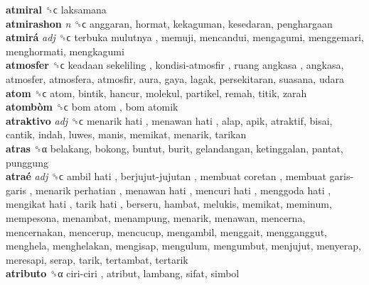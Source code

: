 \textbf{atmiral} ␝ϲ  laksamana  \\
\textbf{atmirashon} \emph{n}  ␝ϲ  anggaran, hormat, kekaguman, kesedaran, penghargaan  \\
\textbf{atmirá} \emph{adj}  ␝ϲ   terbuka mulutnya , memuji, mencandui, mengagumi, menggemari, menghormati, mengkagumi  \\
\textbf{atmosfer} ␝ϲ   keadaan sekeliling ,  kondisi-atmosfir ,  ruang angkasa , angkasa, atmosfer, atmosfera, atmosfir, aura, gaya, lagak, persekitaran, suasana, udara  \\
\textbf{atom} ␝ϲ  atom, bintik, hancur, molekul, partikel, remah, titik, zarah  \\
\textbf{atombòm} ␝ϲ   bom atom ,  bom atomik   \\
\textbf{atraktivo} \emph{adj}  ␝ϲ   menarik hati ,  menawan hati , alap, apik, atraktif, bisai, cantik, indah, luwes, manis, memikat, menarik, tarikan  \\
\textbf{atras} ␝α  belakang, bokong, buntut, burit, gelandangan, ketinggalan, pantat, punggung  \\
\textbf{atraé} \emph{adj}  ␝ϲ   ambil hati ,  berjujut-jujutan ,  membuat coretan ,  membuat garis-garis ,  menarik perhatian ,  menawan hati ,  mencuri hati ,  menggoda hati ,  mengikat hati ,  tarik hati , berseru, hambat, melukis, memikat, meminum, mempesona, menambat, menampung, menarik, menawan, mencerna, mencernakan, mencerup, mencucup, mengambil, menggait, mengganggut, menghela, menghelakan, mengisap, mengulum, mengumbut, menjujut, menyerap, meresapi, serap, tarik, tertambat, tertarik  \\
\textbf{atributo} ␝α   ciri-ciri , atribut, lambang, sifat, simbol  \\
